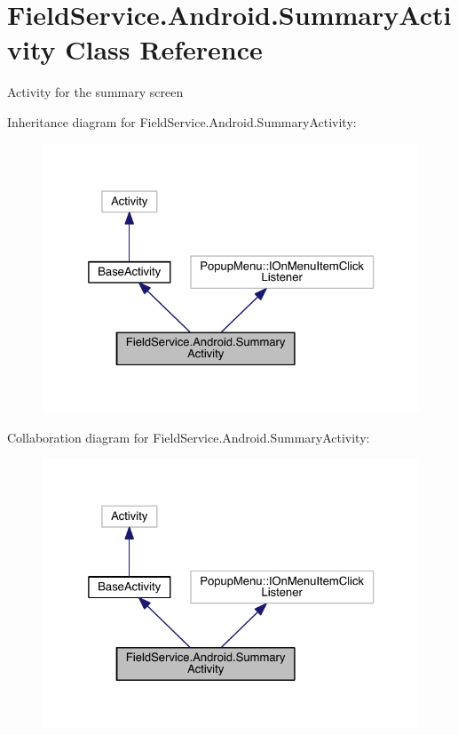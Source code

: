 \hypertarget{class_field_service_1_1_android_1_1_summary_activity}{\section{Field\+Service.\+Android.\+Summary\+Activity Class Reference}
\label{class_field_service_1_1_android_1_1_summary_activity}
}


Activity for the summary screen  




Inheritance diagram for Field\+Service.\+Android.\+Summary\+Activity\+:
\nopagebreak
\begin{figure}[H]
\begin{center}
\leavevmode
\includegraphics[width=325pt]{class_field_service_1_1_android_1_1_summary_activity__inherit__graph}
\end{center}
\end{figure}


Collaboration diagram for Field\+Service.\+Android.\+Summary\+Activity\+:
\nopagebreak
\begin{figure}[H]
\begin{center}
\leavevmode
\includegraphics[width=325pt]{class_field_service_1_1_android_1_1_summary_activity__coll__graph}
\end{center}
\end{figure}
